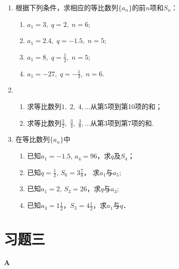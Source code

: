\begin{ex}
\begin{enumerate}
    \item 根据下列条件，求相应的等比数列$\{a_n\}$的前$n$项和$S_n$：
\begin{enumerate}[(1)]
\item $a_1=3,\; q=2,\; n=6$;
\item $a_1=2.4,\; q=-1.5,\; n=5$;
\item $a_1=8,\; q=\frac{1}{2},\; n=5$;
\item $a_1=-27,\; q=-\frac{1}{3},\; n=6$.
\end{enumerate}

    \item \begin{enumerate}[(1)]
    \item 求等比数列$1,\;2,\;4,\ldots$从第5项到第10项的和；
    \item 求等比数列$\frac{3}{2},\; \frac{3}{4},\; \frac{3}{8},\ldots$从第3项到第7项的和.   
    \end{enumerate}

    \item    在等比数列$\{a_n\}$中
\begin{enumerate}[(1)]
\item 已知$a_1=-1.5$, $a_4=96$，求$q$及$S_4$；
\item 已知$q=\frac{1}{2}$, $S_6=3\frac{7}{8}$， 求$a_1$与$a_5$;
\item 已知$a_1=2$, $S_3=26$，求$q$与$a_3$;
\item 已知$a_3=1\frac{1}{2}$，$S_3=4\frac{1}{2}$，求$a_1$与$q$．   
\end{enumerate}

\end{enumerate}
\end{ex}

\section*{习题三}
\begin{center}
    \bfseries A
\end{center}

